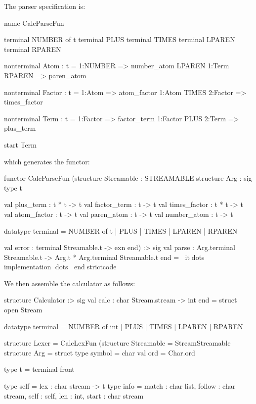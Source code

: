 \documentclass[10pt]{article}
\begin{document}
\begin{strictcode}
\begin{strictcode}
\begin{strictcode}
\begin{strictcode}
\begin{strictcode}
\begin{strictcode}
\begin{strictcode}
\begin{strictcode}
The parser specification is:

\begin{code}
name CalcParseFun

terminal NUMBER of t
terminal PLUS
terminal TIMES
terminal LPAREN
terminal RPAREN

nonterminal Atom : t =
  1:NUMBER => number_atom
  LPAREN 1:Term RPAREN => paren_atom

nonterminal Factor : t =
  1:Atom => atom_factor
  1:Atom TIMES 2:Factor => times_factor

nonterminal Term : t =
  1:Factor => factor_term
  1:Factor PLUS 2:Term => plus_term

start Term
\end{code}

\noindent
which generates the functor:

\begin{strictcode}
functor CalcParseFun
   (structure Streamable : STREAMABLE
    structure Arg :
       sig
          type t

          val plus_term : t * t -> t
          val factor_term : t -> t
          val times_factor : t * t -> t
          val atom_factor : t -> t
          val paren_atom : t -> t
          val number_atom : t -> t

          datatype terminal =
             NUMBER of t
           | PLUS
           | TIMES
           | LPAREN
           | RPAREN

          val error : terminal Streamable.t -> exn
       end)
   :>
   sig
      val parse : Arg.terminal Streamable.t -> Arg.t * Arg.terminal Streamable.t
   end
= itdots implementation dots
endstrictcode

We then assemble the calculator as follows:

\begin{bigstrictcode}

structure Calculator
  :>
  sig
    val calc : char Stream.stream -> int
  end
  =
  struct
     open Stream

     datatype terminal =
        NUMBER of int
      | PLUS
      | TIMES
      | LPAREN
      | RPAREN

     structure Lexer =
        CalcLexFun
        (structure Streamable = StreamStreamable
         structure Arg =
            struct
               type symbol = char
               val ord = Char.ord

               type t = terminal front
    
               type self = { lex : char stream -> t }
               type info = { match : char list,
                             follow : char stream,
                             self : self,
                             len : int,
                             start : char stream }
    

\end{bigstrictcode}
\end{strictcode}
\end{strictcode}
\end{strictcode}
\end{strictcode}
\end{strictcode}
\end{strictcode}
\end{strictcode}
\end{strictcode}
\end{strictcode}
\end{document}
